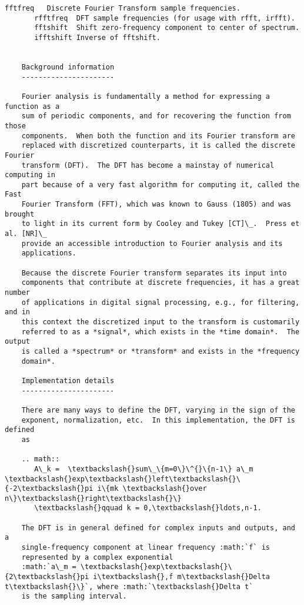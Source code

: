 \documentclass{article}
\begin{document}
\begin{Verbatim}[commandchars=\\\{\}]
       fftfreq   Discrete Fourier Transform sample frequencies.
       rfftfreq  DFT sample frequencies (for usage with rfft, irfft).
       fftshift  Shift zero-frequency component to center of spectrum.
       ifftshift Inverse of fftshift.
    
    
    Background information
    ----------------------
    
    Fourier analysis is fundamentally a method for expressing a function as a
    sum of periodic components, and for recovering the function from those
    components.  When both the function and its Fourier transform are
    replaced with discretized counterparts, it is called the discrete Fourier
    transform (DFT).  The DFT has become a mainstay of numerical computing in
    part because of a very fast algorithm for computing it, called the Fast
    Fourier Transform (FFT), which was known to Gauss (1805) and was brought
    to light in its current form by Cooley and Tukey [CT]\_.  Press et al. [NR]\_
    provide an accessible introduction to Fourier analysis and its
    applications.
    
    Because the discrete Fourier transform separates its input into
    components that contribute at discrete frequencies, it has a great number
    of applications in digital signal processing, e.g., for filtering, and in
    this context the discretized input to the transform is customarily
    referred to as a *signal*, which exists in the *time domain*.  The output
    is called a *spectrum* or *transform* and exists in the *frequency
    domain*.
    
    Implementation details
    ----------------------
    
    There are many ways to define the DFT, varying in the sign of the
    exponent, normalization, etc.  In this implementation, the DFT is defined
    as
    
    .. math::
       A\_k =  \textbackslash{}sum\_\{m=0\}\^{}\{n-1\} a\_m \textbackslash{}exp\textbackslash{}left\textbackslash{}\{-2\textbackslash{}pi i\{mk \textbackslash{}over n\}\textbackslash{}right\textbackslash{}\}
       \textbackslash{}qquad k = 0,\textbackslash{}ldots,n-1.
    
    The DFT is in general defined for complex inputs and outputs, and a
    single-frequency component at linear frequency :math:`f` is
    represented by a complex exponential
    :math:`a\_m = \textbackslash{}exp\textbackslash{}\{2\textbackslash{}pi i\textbackslash{},f m\textbackslash{}Delta t\textbackslash{}\}`, where :math:`\textbackslash{}Delta t`
    is the sampling interval.
    

\end{Verbatim}
\end{document}
